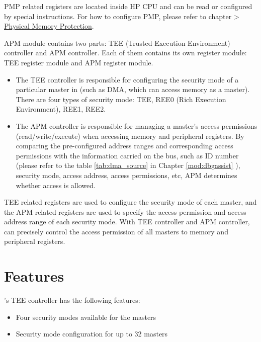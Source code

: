 \documentclass[main\_\_EN.tex]{subfiles}
\begin{document}
PMP related registers are located inside HP CPU and can be read or configured by special instructions. For how to configure PMP, please refer to chapter \textit{} > \hyperref[sec:riscvcpu-pmp]{Physical Memory Protection}.

APM module contains two parts: TEE (Trusted Execution Environment) controller and APM controller. Each of them contains its own register module: TEE register module and APM register module.

\begin{itemize}
    \item The TEE controller is responsible for configuring the security mode of a particular master in \chipname{} (such as DMA, which can access memory as a master). There are four types of security mode: TEE, REE0 (Rich Execution Environment), REE1, REE2.
    \item The APM controller is responsible for managing a master's access permissions (read/write/execute) when accessing memory and peripheral registers. By comparing the pre-configured address ranges and corresponding access permissions with the information carried on the bus, such as ID number (please refer to the table \ref{tab:dma_source} in Chapter \ref{mod:dbgassist} ), security mode, access address, access permissions, etc, APM determines whether access is allowed.
\end{itemize}

TEE related registers are used to configure the security mode of each master, and the APM related registers are used to specify the access permission and access address range of each security mode. With TEE controller and APM controller, \chipname{} can precisely control the access permission of all masters to memory and peripheral registers.


\section{Features}

\chipname{}'s TEE controller has the following features:

\begin{itemize}
    \item Four security modes available for the masters
    \item Security mode configuration for up to 32 masters

\end{itemize}
\end{document}
